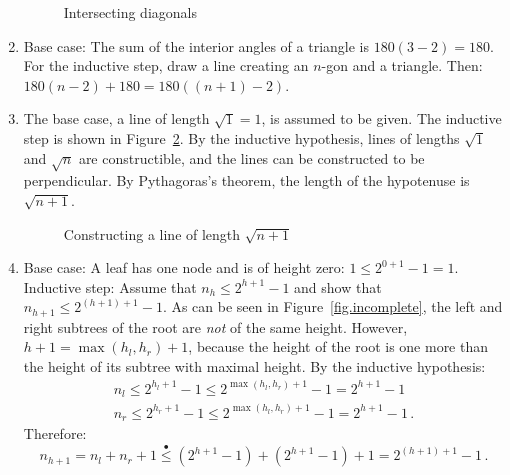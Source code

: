 \documentclass[11pt,a4paper]{report}
\newcommand*{\ihle}{\stackrel{\bullet}{\leq}}
\begin{document}
\begin{enumerate}
\begin{figure}[t]
\begin{center}

\caption{Intersecting diagonals}\label{fig.intersect}
\end{center}
\end{figure}

\item Base case: The sum of the interior angles of a triangle is $180(3-2)=180$. For the inductive step, draw a line creating an $n$-gon and a triangle. Then: $	180(n-2) + 180 = 180((n+1)-2)$. 

\item The base case, a line of length $\sqrt{1}=1$, is assumed to be given. The inductive step is shown in Figure~\ref{fig.pyth}. By the inductive hypothesis, lines of lengths $\sqrt{1}$ and $\sqrt{n}$ are constructible, and the lines can be constructed to be perpendicular. By Pythagoras's theorem, the length of the hypotenuse is $\sqrt{n+1}$.

\begin{figure}[hb]
\begin{center}
\caption{Constructing a line of length $\sqrt{n+1}$}\label{fig.pyth}
\end{center}
\end{figure}

\item Base case: A leaf has one node and is of height zero: $1\leq 2^{0+1}-1=1$. Inductive step: Assume that $n_h\leq 2^{h+1}-1$ and show that $n_{h+1}\leq 2^{(h+1)+1}-1$. As can be seen in Figure~\ref{fig.incomplete}, the left and right subtrees of the root are \emph{not} of the same height. However, $h+1=\max(h_l,h_r)+1$, because the height of the root is one more than the height of its subtree with maximal height. By the inductive hypothesis:
\[
\begin{array}{l}
n_l\leq 2^{h_l+1}-1\leq 2^{\max(h_l,h_r)+1}-1 = 2^{h+1}-1\\
n_r\leq 2^{h_r+1}-1\leq 2^{\max(h_l,h_r)+1}-1 = 2^{h+1}-1\,.
\end{array}
\]
Therefore:
\[
n_{h+1} = n_l + n_r + 1 \ihle{} (2^{h+1}-1) + (2^{h+1}-1) + 1 = 2^{(h+1)+1} - 1\,.
\]


\end{enumerate}
\end{document}
